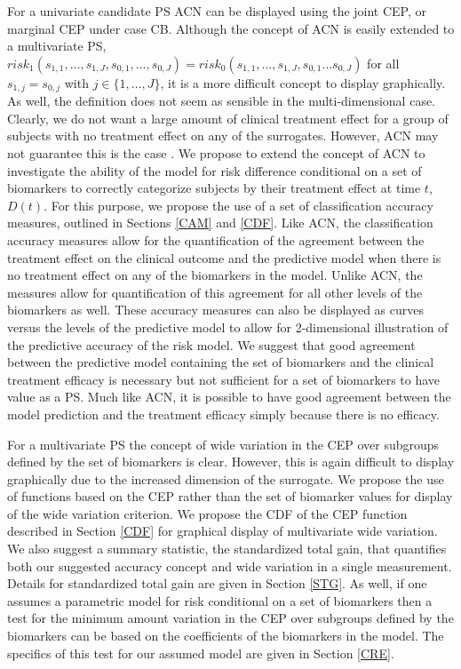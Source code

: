\documentclass[times, doublespace]{simauth}
\begin{document}
For a univariate candidate PS ACN can be displayed using the joint CEP, or marginal CEP under case CB.  Although the concept of ACN is easily extended to a multivariate PS, $risk_1(s_{1,1}, \dots, s_{1,J} ,s_{0,1}, \dots, s_{0,J})=risk_0(s_{1,1}, \dots, s_{1,J} ,s_{0,1} \dots s_{0,J})$ for all $s_{1,j} = s_{0,j}$ with $j \in \{1, \dots, J\}$, it is a more difficult concept to display graphically. As well, the definition does not seem as sensible in the multi-dimensional case. Clearly, we do not want a large amount of clinical treatment effect for a group of subjects with no treatment effect on any of the surrogates. However, ACN may not guarantee this is the case \citep{Vanderweele11}. We propose to extend the concept of ACN to investigate the ability of the model for risk difference conditional on a set of biomarkers to correctly categorize subjects by their treatment effect at time $t$, $D(t)$. For this purpose, we propose the use of a set of classification accuracy measures, outlined in Sections \ref{CAM} and \ref{CDF}. Like ACN, the classification accuracy measures allow for the quantification of the agreement between the treatment effect on the clinical outcome and the predictive model when there is no treatment effect on any of the biomarkers in the model.  Unlike ACN, the measures allow for quantification of this agreement for all other levels of the biomarkers as well.  These accuracy measures can also be displayed as curves versus the levels of the predictive model to allow for 2-dimensional  illustration of the predictive accuracy of the risk model. We suggest that good agreement between the predictive model containing the set of biomarkers and the clinical treatment efficacy is necessary but not sufficient for a set of biomarkers to have value as a PS. Much like ACN, it is possible to have good agreement between the model prediction and the treatment efficacy simply because there is no efficacy. 


 For a multivariate PS the concept of wide variation in the CEP over subgroups defined by the set of biomarkers is clear. However, this is again difficult to display graphically due to the increased dimension of the surrogate. We propose the use of functions based on the CEP rather than the set of biomarker values for display of the wide variation criterion. We propose the CDF of the CEP function described in Section \ref{CDF} for graphical display of multivariate wide variation. We also suggest a summary statistic, the standardized total gain, that quantifies both our suggested accuracy concept and wide variation in a single measurement. Details for standardized total gain are given in Section \ref{STG}.  As well, if one assumes a parametric model for risk conditional on a set of biomarkers then a test for the minimum amount variation in the CEP over subgroups defined by the biomarkers can be based on the coefficients of the biomarkers in the model. The specifics of this test for our assumed model are given in Section \ref{CRE}.
\end{document}
